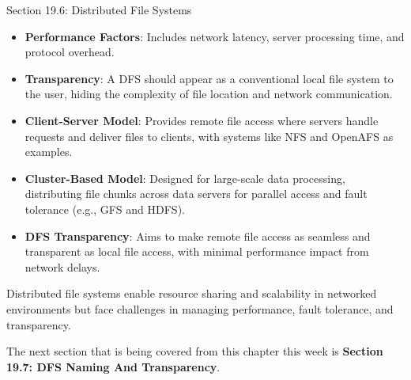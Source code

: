 \begin{notes}{Section 19.6: Distributed File Systems}
    \begin{highlight}
    
        \begin{itemize}
            \item \textbf{Performance Factors}: Includes network latency, server processing time, and protocol overhead.
            \item \textbf{Transparency}: A DFS should appear as a conventional local file system to the user, hiding the complexity of file location and network communication.
        \end{itemize}
    
    \end{highlight}
    
    \begin{highlight}
    
        \begin{itemize}
            \item \textbf{Client-Server Model}: Provides remote file access where servers handle requests and deliver files to clients, with systems like NFS and OpenAFS as examples.
            \item \textbf{Cluster-Based Model}: Designed for large-scale data processing, distributing file chunks across data servers for parallel access and fault tolerance (e.g., GFS and HDFS).
            \item \textbf{DFS Transparency}: Aims to make remote file access as seamless and transparent as local file access, with minimal performance impact from network delays.
        \end{itemize}
    
    Distributed file systems enable resource sharing and scalability in networked environments but face challenges in managing performance, fault tolerance, and transparency.
    
    \end{highlight}
\end{notes}

The next section that is being covered from this chapter this week is \textbf{Section 19.7: DFS Naming And Transparency}.

